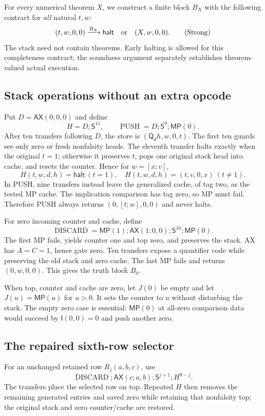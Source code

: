 \documentclass[11pt,a4paper]{article}
\theoremstyle{definition}
\newcommand{\imp}{\mathsf I}
\newcommand{\qnt}{\mathsf Q}
\newcommand{\AX}{\mathsf{AX}}
\newcommand{\MP}{\mathsf{MP}}
\newcommand{\Tr}{\mathsf S}
\numberwithin{equation}{section}
\begin{document}
For every numerical theorem $X$, we construct a finite block $B_X$ with
the following contract for \emph{all} natural $t,w$:
\[
 (t,w,0,0)\xrightarrow{B_X}\mathsf{halt}
 \quad\hbox{or}\quad(X,w,0,0).
 \qquad\text{(Strong)}
\]
The stack need not contain theorems. Early halting is allowed for this
completeness contract; the soundness argument separately establishes
theorem-valued actual execution.

\subsection{Stack operations without an extra opcode}

Put $D=\AX(0;0,0)$ and define
\[
 H=D;\Tr^{11},\qquad
 \operatorname{PUSH}=D;\Tr^9;\MP(0).
\]
After ten transfers following $D$, the store is
$(\qnt_d h,w,0,t)$. The first ten guards see only zero or fresh nonfalsity
heads. The eleventh transfer halts exactly when the original $t=1$;
otherwise it preserves $t$, pops one original stack head into cache,
and resets the counter. Hence for $w=[x;v]$,
\[
 H(t,w,d,h)=\mathsf{halt}\ (t=1),\quad
 H(t,w,d,h)=(t,v,0,x)\ (t\ne1).
\]
In PUSH, nine transfers instead leave the generalized cache, of tag two,
as the tested MP cache. The implication comparison has tag zero, so MP
must fail. Therefore PUSH always returns $(0,[t;w],0,0)$ and never halts.

For zero incoming counter and cache, define
\[
 \operatorname{DISCARD}=\MP(1);\AX(1;0,0);\Tr^{10};\MP(0).
\]
The first MP fails, yields counter one and top zero, and preserves the
stack. AX has $A=C=1$, hence gate zero. Ten transfers expose a quantifier
code while preserving the old stack and zero cache. The last MP fails
and returns $(0,w,0,0)$. This gives the truth block $B_0$.

When top, counter and cache are zero, let $J(0)$ be empty and let
$J(u)=\MP(u)$ for $u>0$. It sets the counter to $u$ without disturbing
the stack. The empty zero case is essential: $\MP(0)$ at all-zero
comparison data would succeed by $\imp(0,0)=0$ and push another zero.

\subsection{The repaired sixth-row selector}

For an unchanged retained row $R_j(a,b,c)$, use
\[
 \operatorname{DISCARD};\AX(c;a,b);\Tr^{j+1};H^{9-j}.
\]
The transfers place the selected row on top. Repeated $H$ then removes
the remaining generated entries and saved zero while retaining that
nonfalsity top; the original stack and zero counter/cache are restored.
\end{document}
